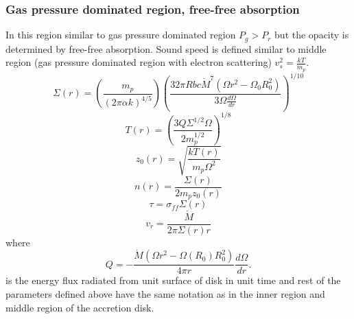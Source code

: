 \documentclass[useAMS,usenatbib]{mn2e}
\begin{document}
\subsubsection{Gas pressure dominated region, free-free absorption}
In this region similar to gas pressure dominated region $P_g > P_r$ but the opacity is determined by free-free absorption. Sound speed is defined similar to middle region (gas pressure dominated region with electron scattering) $v^2_s = \frac{kT}{m_p}$.
\begin{equation}
\Sigma (r) = \left(\frac{m_p}{(2\pi\alpha k)^{4/5}}\right)\left(\frac{32\pi R bc \dot{M}^7\left(\Omega r^2 - \Omega_0 R_0^2\right)}{3\Omega\frac{d\Omega}{dr}}\right)^{1/10}
\end{equation}
\begin{equation}
T(r) = \left(\frac{3Q \Sigma^{1/2}\Omega}{2 m_p^{1/2}}\right)^{1/8}
\end{equation}
\begin{equation}
z_0(r) = \sqrt{\frac{k T(r)}{m_p\Omega^2}}
\end{equation}
\begin{equation}
n(r) = \frac{\Sigma(r)}{2m_p z_0(r)}
\end{equation}
\begin{equation}
\tau = \sigma_{ff}\Sigma(r)
\end{equation}
\begin{equation}
v_r = \frac{\dot{M}}{2\pi\Sigma(r) r}
\end{equation}
where 
\begin{equation}
Q = -\frac{\dot{M}\left(\Omega r^2 - \Omega(R_0)R_0^2\right)}{4\pi r}\frac{d\Omega}{dr}.
\end{equation}
is the energy flux radiated from unit surface of disk in unit time and rest of the parameters defined above have the same notation as in the inner region and middle region of the accretion disk.
\end{document}
